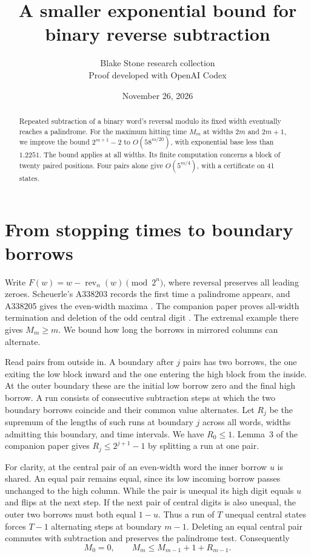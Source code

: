 \documentclass[11pt]{article}
\title{A smaller exponential bound for binary reverse subtraction}
\author{Blake Stone research collection\\\small Proof developed with OpenAI Codex}
\date{November 26, 2026}
\newcommand{\rev}{\operatorname{rev}}
\begin{document}
\maketitle
\begin{abstract}
Repeated subtraction of a binary word's reversal modulo its fixed width eventually reaches a palindrome. For the maximum hitting time $M_m$ at widths $2m$ and $2m+1$, we improve the bound $2^{m+1}-2$ to $O(58^{m/20})$, with exponential base less than $1.2251$. The bound applies at all widths. Its finite computation concerns a block of twenty paired positions. Four pairs alone give $O(5^{m/4})$, with a certificate on 41 states.
\end{abstract}

\section{From stopping times to boundary borrows}
Write $F(w)=w-\rev_n(w)\pmod {2^n}$, where reversal preserves all leading zeroes. Scheuerle's A338203 records the first time a palindrome appears, and A338205 gives the even-width maxima \cite{tri,max}. The companion paper proves all-width termination and deletion of the odd central digit \cite{first}. The extremal example there gives $M_m\ge m$. We bound how long the borrows in mirrored columns can alternate.

Read pairs from outside in. A boundary after $j$ pairs has two borrows, the one exiting the low block inward and the one entering the high block from the inside. At the outer boundary these are the initial low borrow zero and the final high borrow. A run consists of consecutive subtraction steps at which the two boundary borrows coincide and their common value alternates. Let $R_j$ be the supremum of the lengths of such runs at boundary $j$ across all words, widths admitting this boundary, and time intervals. We have $R_0\le1$. Lemma~3 of the companion paper gives $R_j\le2^{j+1}-1$ by splitting a run at one pair.

For clarity, at the central pair of an even-width word the inner borrow $u$ is shared. An equal pair remains equal, since its low incoming borrow passes unchanged to the high column. While the pair is unequal its high digit equals $u$ and flips at the next step. If the next pair of central digits is also unequal, the outer two borrows must both equal $1-u$. Thus a run of $T$ unequal central states forces $T-1$ alternating steps at boundary $m-1$. Deleting an equal central pair commutes with subtraction and preserves the palindrome test. Consequently
\begin{equation}\label{eq:time}
 M_0=0,\qquad M_m\le M_{m-1}+1+R_{m-1}.
\end{equation}
\end{document}
